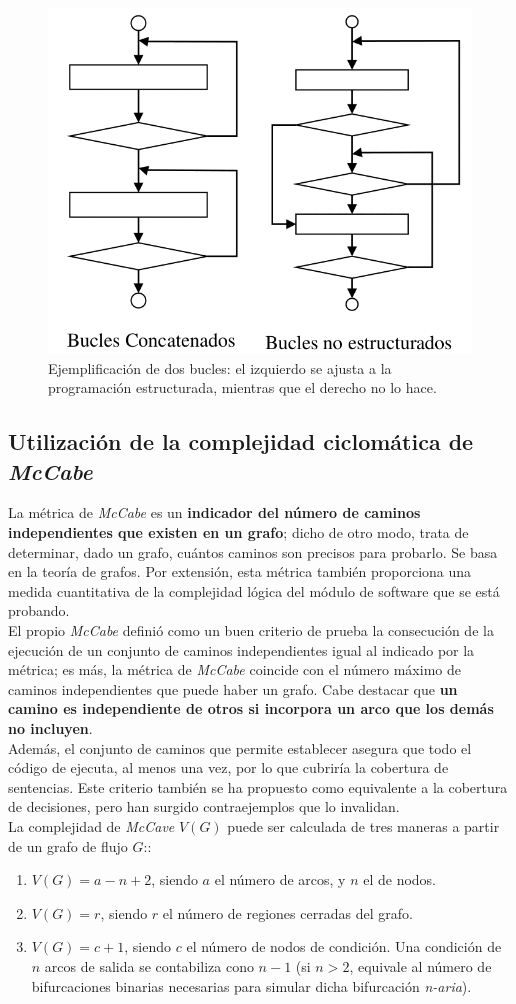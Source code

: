 \begin{figure}[H]
    \centering
    \includegraphics[width=0.5\linewidth]{Resources/Tema6/Ejemplo_BucleNoEstructurado.png}
    \caption{Ejemplificación de dos bucles: el izquierdo se ajusta a la programación estructurada, mientras que el derecho no lo hace.}
\end{figure}

\subsection{Utilización de la complejidad ciclomática de \textit{McCabe}}

La métrica de \textit{McCabe} es un \textbf{indicador del número de caminos independientes que existen en un grafo}; dicho de otro modo, trata de determinar, dado un grafo, cuántos caminos son precisos para probarlo. Se basa en la teoría de grafos. Por extensión, esta métrica también proporciona una medida cuantitativa de la complejidad lógica del módulo de software que se está probando.\\

El propio \textit{McCabe} definió como un buen criterio de prueba la consecución de la ejecución de un conjunto de caminos independientes igual al indicado por la métrica; es más, la métrica de \textit{McCabe} coincide con el número máximo de caminos independientes que puede haber un grafo. Cabe destacar que \textbf{un camino es independiente de otros si incorpora un arco que los demás no incluyen}.\\

Además, el conjunto de caminos que permite establecer asegura que todo el código de ejecuta, al menos una vez, por lo que cubriría la cobertura de sentencias. Este criterio también se ha propuesto como equivalente a la cobertura de decisiones, pero han surgido contraejemplos que lo invalidan.\\

La complejidad de \textit{McCave} $V (G)$ puede ser calculada de tres maneras a partir de un grafo de flujo $G$::
\begin{enumerate}
    \item $V (G) = a-n+2$, siendo $a$ el número de arcos, y $n$ el de nodos.
    \item $V (G) = r$, siendo $r$ el número de regiones cerradas del grafo.
    \item $V (G) = c+1$, siendo $c$ el número de nodos de condición. Una condición de $n$ arcos de salida se contabiliza cono $n-1$ (si $n>2$, equivale al número de bifurcaciones binarias necesarias para simular dicha bifurcación \textit{n-aria}).
\end{enumerate}

